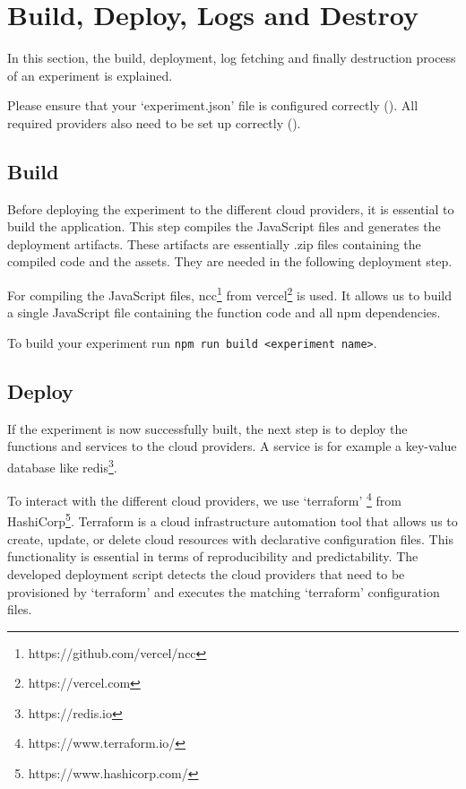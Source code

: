 \documentclass[../main.tex]{subfiles}
\begin{document}
\section{Build, Deploy, Logs and Destroy}\label{sec:builddeploylogsanddestroy}
In this section, the build, deployment, log fetching and finally destruction process of an experiment is explained.

Please ensure that your `experiment.json' file is configured correctly (). 
All required providers also need to be set up correctly ().

\subsection{Build}\label{sec:build}
Before deploying the experiment to the different cloud providers, 
it is essential to build the application. 
This step compiles the JavaScript files and generates the deployment artifacts. 
These artifacts are essentially .zip files containing the compiled code and the assets. 
They are needed in the following deployment step. 

For compiling the JavaScript files, ncc\footnote{https://github.com/vercel/ncc} 
from vercel\footnote{https://vercel.com} is used.
It allows us to build a single JavaScript file containing the function code and all npm dependencies.

To build your experiment run \texttt{npm run build <experiment name>}.

\subsection{Deploy}\label{sec:deploy}
If the experiment is now successfully built, 
the next step is to deploy the functions and services to the cloud providers. 
A service is for example a key-value database like redis\footnote{https://redis.io}. 

To interact with the different cloud providers, we use `terraform'%
\footnote{https://www.terraform.io/} from HashiCorp\footnote{https://www.hashicorp.com/}. 
Terraform is a cloud infrastructure automation tool that allows us to create, 
update, or delete cloud resources with declarative configuration files. 
This functionality is essential in terms of reproducibility and predictability.
The developed deployment script detects the cloud providers that need to be provisioned by `terraform'
and executes the matching `terraform' configuration files.
\end{document}
